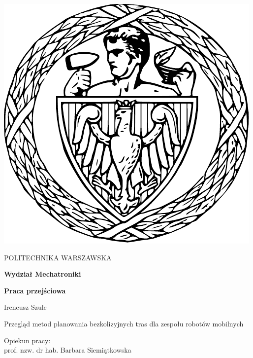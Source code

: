 
\thispagestyle {empty}

\begin{center}
	\includegraphics[scale=0.4]{img/pw}
	
	\vspace{0.5cm}
	
	{\fontsize{20}{20}\selectfont POLITECHNIKA WARSZAWSKA}
	
	\vspace{1.0cm}
	
	\textbf{{\fontsize{14}{14}\selectfont Wydział Mechatroniki}}
	
	\vspace{1.5cm}
	
	\textbf{{\fontsize{14}{14}\selectfont Praca przejściowa}}

	\vspace{2.0cm}
	
	{\fontsize{14}{14}\selectfont Ireneusz Szulc}
	
	\vspace{1cm}
	
	{\fontsize{28}{28}\selectfont Przegląd metod planowania bezkolizyjnych tras dla zespołu robotów mobilnych}
	
	\vspace{1cm}
	\begin{flushright}
		{\fontsize{14}{14}\selectfont Opiekun pracy: \\ 
		prof. nzw. dr hab. Barbara Siemiątkowska
		}
	

\end{flushright}
\end{center}
